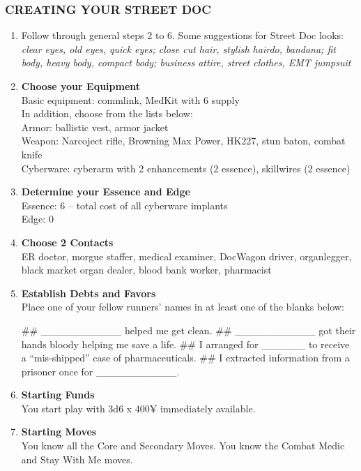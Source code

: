 \subsubsection{CREATING YOUR STREET DOC}
\begin{enumerate}
    \item Follow through general steps 2 to 6. Some suggestions for Street Doc looks: \textit{clear eyes, old eyes, quick eyes; close cut hair, stylish hairdo, bandana; fit body, heavy body, compact body; business attire, street clothes, EMT jumpsuit}
    
    \item \textbf{Choose your Equipment} \\
    Basic equipment: commlink, MedKit with 6 supply \\
    In addition, choose from the lists below: \\
    Armor: ballistic vest, armor jacket \\
    Weapon: Narcoject rifle, Browning Max Power, HK227, stun baton, combat knife \\
    Cyberware: cyberarm with 2 enhancements (2 essence), skillwires (2 essence) \\
    
    \item \textbf{Determine your Essence and Edge} \\
    Essence: 6 – total cost of all cyberware implants \\
    Edge: 0
    
    \item \textbf{Choose 2 Contacts} \\
    ER doctor, morgue staffer, medical examiner, DocWagon driver, organlegger, black market organ dealer, blood bank worker, pharmacist
    
    \item \textbf{Establish Debts and Favors} \\
    Place one of your fellow runners’ names in at least one of the blanks below:
        \begin{easylist}
            ## \_\_\_\_\_\_\_\_\_\_\_ helped me get clean.
            ## \_\_\_\_\_\_\_\_\_\_\_ got their hands bloody helping me save a life.
            ## I arranged for \_\_\_\_\_\_ to receive a “mis-shipped” case of pharmaceuticals.
            ## I extracted information from a prisoner once for \_\_\_\_\_\_\_\_\_\_\_.
        \end{easylist}
    
    \item \textbf{Starting Funds} \\
    You start play with 3d6 x 400¥ immediately available.
    
    \item \textbf{Starting Moves} \\
    You know all the Core and Secondary Moves. You know the Combat Medic and Stay With Me moves.
\end{enumerate}

